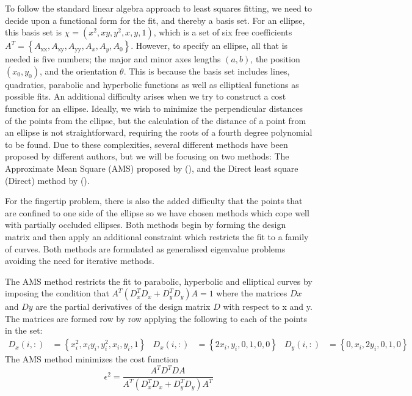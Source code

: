 To follow the standard linear algebra approach to least squares fitting, we need to decide upon a functional form for the fit, and thereby a basis set. For an ellipse, this basis set is $\chi= \left(x^2, x y, y^2, x, y, 1\right)$, which is a set of six free coefficients $ A^T=\left\{A_{\text{xx}},A_{\text{xy}},A_{\text{yy}},A_x,A_y,A_0\right\}$. However, to specify an ellipse, all that is needed is five numbers; the major and minor axes lengths $(a,b)$, the position $(x_0,y_0)$, and the orientation $\theta$. This is because the basis set includes lines, quadratics, parabolic and hyperbolic functions as well as elliptical functions as possible fits. An additional difficulty arises when we try to construct a cost function for an ellipse. Ideally, we wish to minimize the perpendicular distances of the points from the ellipse, but the calculation of the distance of a point from an ellipse is not straightforward, requiring the roots of a fourth degree polynomial to be found. Due to these complexities, several different methods have been proposed by different authors, but we will be focusing on two methods: The Approximate Mean Square (AMS)  proposed by (\cite{Taubin1991}), and the Direct least square (Direct) method by (\cite{Fitzgibbon1999}).


For the fingertip problem, there is also the added difficulty that the points that are confined to one side of the ellipse so we have chosen methods which cope well with partially occluded ellipses. Both methods begin by forming the design matrix and then apply an additional constraint which restricts the fit to a family of curves. Both methods are formulated as generalised eigenvalue problems avoiding the need for iterative methods.

The AMS method restricts the fit to parabolic, hyperbolic and elliptical curves by imposing the condition that $ A^T ( D_x^T D_x  +   D_y^T D_y) A = 1$ where the matrices $Dx$ and $Dy$ are the partial derivatives of the design matrix $D$ with respect to x and y. The matrices are formed row by row applying the following to each of the points in the set:
\begin{align*}
D_x(i,:)&=\left\{x_i^2, x_i y_i, y_i^2, x_i, y_i, 1\right\} &
D_x(i,:)&=\left\{2 x_i,y_i,0,1,0,0\right\} &
D_y(i,:)&=\left\{0,x_i,2 y_i,0,1,0\right\}
\end{align*}
The AMS method minimizes the cost function
\begin{equation*}
\epsilon ^2=\frac{ A^T D^T D A }{ A^T (D_x^T D_x +  D_y^T D_y) A^T }
\end{equation*}

